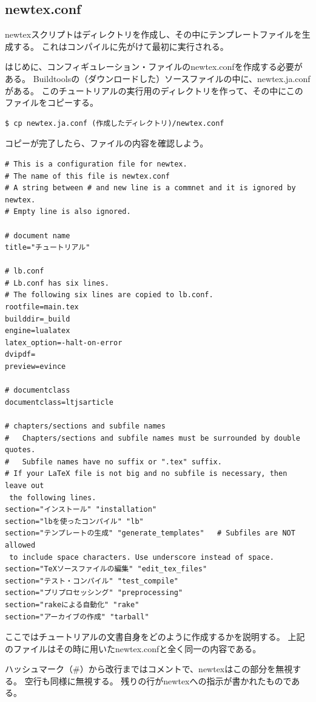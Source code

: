 \subsection{newtex.conf}
newtexスクリプトはディレクトリを作成し、その中にテンプレートファイルを生成する。
これはコンパイルに先がけて最初に実行される。

はじめに、コンフィギュレーション・ファイルのnewtex.confを作成する必要がある。
Buildtoolsの（ダウンロードした）ソースファイルの中に、newtex.ja.confがある。
このチュートリアルの実行用のディレクトリを作って、その中にこのファイルをコピーする。
\begin{verbatim}
$ cp newtex.ja.conf (作成したディレクトリ)/newtex.conf
\end{verbatim}
コピーが完了したら、ファイルの内容を確認しよう。
\begin{verbatim}
# This is a configuration file for newtex.
# The name of this file is newtex.conf
# A string between # and new line is a commnet and it is ignored by newtex.
# Empty line is also ignored. 

# document name
title="チュートリアル"

# lb.conf
# Lb.conf has six lines.
# The following six lines are copied to lb.conf.
rootfile=main.tex
builddir=_build
engine=lualatex
latex_option=-halt-on-error
dvipdf=
preview=evince

# documentclass
documentclass=ltjsarticle

# chapters/sections and subfile names
#   Chapters/sections and subfile names must be surrounded by double quotes.
#   Subfile names have no suffix or ".tex" suffix.
# If your LaTeX file is not big and no subfile is necessary, then leave out
 the following lines.
section="インストール" "installation"
section="lbを使ったコンパイル" "lb"
section="テンプレートの生成" "generate_templates"   # Subfiles are NOT allowed
 to include space characters. Use underscore instead of space. 
section="TeXソースファイルの編集" "edit_tex_files"
section="テスト・コンパイル" "test_compile"
section="プリプロセッシング" "preprocessing"
section="rakeによる自動化" "rake"
section="アーカイブの作成" "tarball"
\end{verbatim}
ここではチュートリアルの文書自身をどのように作成するかを説明する。
上記のファイルはその時に用いたnewtex.confと全く同一の内容である。

ハッシュマーク（\#）から改行まではコメントで、newtexはこの部分を無視する。
空行も同様に無視する。
残りの行がnewtexへの指示が書かれたものである。

